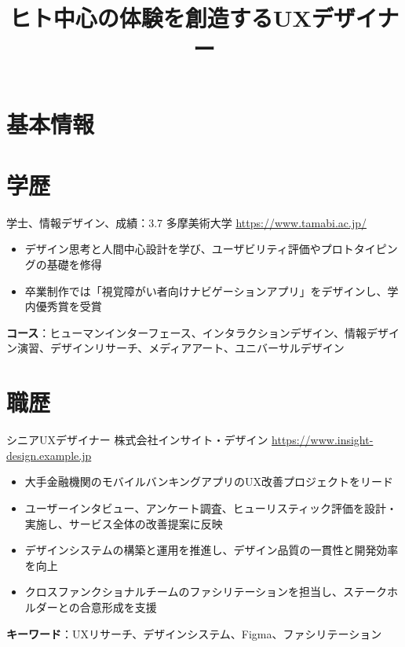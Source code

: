 \documentclass[a4paper, serif, 10pt]{moderncv}
\title{ヒト中心の体験を創造するUXデザイナー}
\begin{document}
\maketitle

\section{基本情報}

\section{学歴}

        {学士、情報デザイン、成績：3.7}
        {多摩美術大学}
        {\url{https://www.tamabi.ac.jp/}}
        {}
        {\begin{itemize}
\item デザイン思考と人間中心設計を学び、ユーザビリティ評価やプロトタイピングの基礎を修得
\item 卒業制作では「視覚障がい者向けナビゲーションアプリ」をデザインし、学内優秀賞を受賞
\end{itemize}
\textbf{コース}：ヒューマンインターフェース、インタラクションデザイン、情報デザイン演習、デザインリサーチ、メディアアート、ユニバーサルデザイン}
\section{職歴}

        {シニアUXデザイナー}
        {株式会社インサイト・デザイン}
        {\url{https://www.insight-design.example.jp}}
        {}
        {\begin{itemize}
\item 大手金融機関のモバイルバンキングアプリのUX改善プロジェクトをリード
\item ユーザーインタビュー、アンケート調査、ヒューリスティック評価を設計・実施し、サービス全体の改善提案に反映
\item デザインシステムの構築と運用を推進し、デザイン品質の一貫性と開発効率を向上
\item クロスファンクショナルチームのファシリテーションを担当し、ステークホルダーとの合意形成を支援
\end{itemize}
\textbf{キーワード}：UXリサーチ、デザインシステム、Figma、ファシリテーション}
\end{document}
